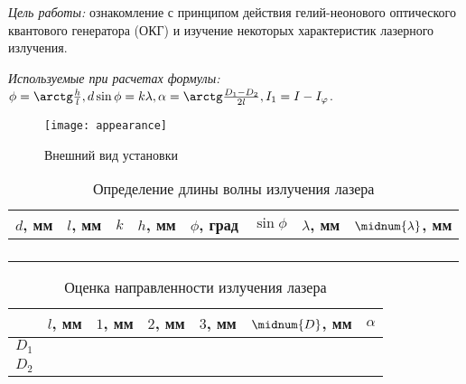 \documentclass[10pt, pscyr, nonums]{hedlabwork}
\date{13.11.2013}
\begin{document}
    \makeheader

    \emph{Цель работы:} ознакомление с принципом действия гелий-неонового
    оптического квантового генератора (ОКГ) и изучение некоторых характеристик
    лазерного излучения.
    
    \emph{Используемые при расчетах формулы:}
    \( \phi = \arctg\frac{h}{l}, d\sin\phi = k\lambda,
        \alpha = \arctg\frac{D_1 - D_2}{2l}, I_1 = I - I_\varphi \).

    \begin{figure}[h!]
        \center
        \texttt{[image: appearance]}\\
        \parbox{.4\textwidth}{\caption{Внешний вид установки}}
    \end{figure}
    \vspace*{-2em}
    
    \begin{table}[h!]
        \center \caption{Определение длины волны излучения лазера}
        \begin{tabular}{|*{8}{C{.08}|}} \hline
            \( d \), мм & \( l \), мм & \( k \) & \( h \), мм &
                \( \phi \), град & \( \sin\phi \) & \( \lambda \), мм &
                \( \midnum{\lambda} \), мм \\ \hline
             &  &&&&&&
                 \\ 
            &&&&&&& \\ \hline
             &  &&&&&&
                 \\ 
            &&&&&&& \\ \hline
        \end{tabular}
    \end{table}
    
    \begin{table}[h!]
        \center \caption{Оценка направленности излучения лазера}
        \begin{tabular}{|*{7}{C{.08}|}} \hline
          & \( l \), мм & \( 1 \), мм & \( 2 \), мм & \( 3 \), мм &
              \( \midnum{D} \), мм & \( \alpha \) \\ \hline
          \( D_1 \) &  &&&&&
               \\ 
          \( D_2 \) &&&&&& \\ \hline
        \end{tabular}
    \end{table}
    
\end{document}
